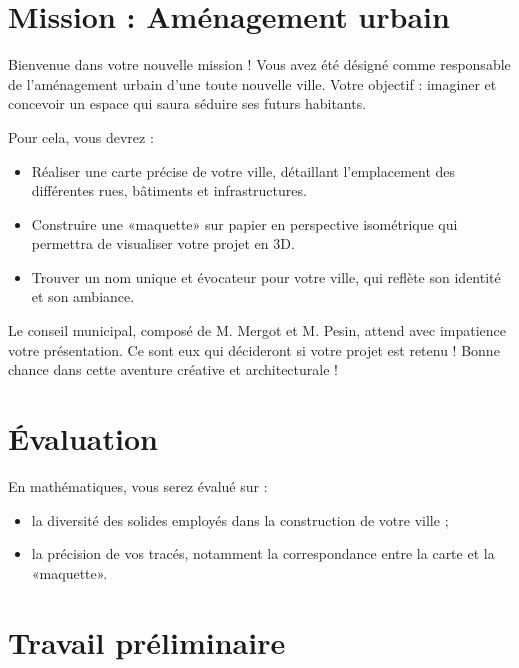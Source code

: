 \emptyBackground
\def\authors{M. MERGOT et M. PESIN}

\small

\section*{Mission : Aménagement urbain}
\vspace{-0.15cm}

Bienvenue dans votre nouvelle mission !
Vous avez été désigné comme responsable de l'aménagement urbain d'une toute nouvelle ville.
Votre objectif : imaginer et concevoir un espace qui saura séduire ses futurs habitants.

Pour cela, vous devrez :
\begin{itemize}
    \item Réaliser une carte précise de votre ville, détaillant l'emplacement des différentes rues, bâtiments et infrastructures.
    \item Construire une «maquette» sur papier en perspective isométrique qui permettra de visualiser votre projet en 3D.
    \item \bonus Trouver un nom unique et évocateur pour votre ville, qui reflète son identité et son ambiance.
\end{itemize}

Le conseil municipal, composé de M. Mergot et M. Pesin, attend avec impatience votre présentation.
Ce sont eux qui décideront si votre projet est retenu !
Bonne chance dans cette aventure créative et architecturale !
\vspace{-0.5cm}
\section*{Évaluation}
\vspace{-0.15cm}
En mathématiques, vous serez évalué sur :
\begin{itemize}
    \item la diversité des solides employés dans la construction de votre ville ;
    \item la précision de vos tracés, notamment la correspondance entre la carte et la «maquette».
\end{itemize}

\vspace{-0.5cm}
\section*{Travail préliminaire}
\vspace{-0.15cm}

